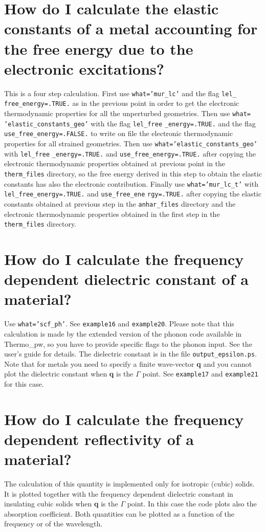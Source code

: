 \documentclass[12pt,a4paper,twoside]{report}
\def\thermo{{\sc Thermo}\_{\sc pw}}
\begin{document}
\newpage
{\color{coral}\section{How do I calculate the elastic constants of a metal
accounting for the free energy due to the electronic excitations?}}
\color{black}
This is a four step calculation. First use \texttt{what='mur\_lc'} and
the flag \texttt{lel\_} \texttt{free\_energy=.TRUE.} as in the previous point
in order to get the electronic thermodynamic properties for all the 
unperturbed geometries. Then use \texttt{what=} \texttt{'elastic\_constants\_geo'}
with the flag \texttt{lel\_free} \texttt{\_energy=.TRUE.} and the flag
\texttt{use\_free\_energy=.FALSE.} to write on file the electronic
thermodynamic properties for all strained geometries. Then use
\texttt{what='elastic\_constants\_geo'} with \texttt{lel\_free}
\texttt{\_energy=.TRUE.}
and \texttt{use\_free\_energy=.TRUE.} after copying the electronic
thermodynamic properties obtained at previous point in the 
\texttt{therm\_files} directory, so the 
free energy derived in this step to obtain the elastic constants 
has also the electronic contribution. 
Finally use \texttt{what='mur\_lc\_t'} with \texttt{lel\_free\_energy=.TRUE.}
and \texttt{use\_free\_ene} \texttt{rgy=.TRUE.} after copying the elastic
constants obtained at previous step in the \texttt{anhar\_files} directory
and the electronic thermodynamic properties obtained in the first 
step in the \texttt{therm\_files} directory.

\newpage
{\color{coral}\section{How do I calculate the frequency dependent dielectric
constant of a material?}}
\color{black}
Use \texttt{what='scf\_ph'}. See \texttt{example16} and \texttt{example20}. 
Please note that this calculation is made by the extended version of the
phonon code available in \thermo, so you have to provide specific flags
to the phonon input. See the user's guide for details. 
The dielectric constant is in the file \texttt{output\_epsilon.ps}.
Note that for metals you need to specify a finite wave-vector {\bf q} and you 
cannot plot the dielectric constant when {\bf q} is the $\Gamma$ point.  
See \texttt{example17} and \texttt{example21} for this case. 

\newpage
{\color{coral}\section{How do I calculate the frequency dependent 
reflectivity of a material?}}
\color{black}
The calculation of this quantity is implemented only for isotropic 
(cubic) solids. It is plotted together with the frequency dependent 
dielectric constant in insulating cubic solids when {\bf q} is 
the $\Gamma$ point. In this case the code plots also the 
absorption coefficient. Both quantities can be plotted as a function of
the frequency or of the wavelength.
\end{document}
